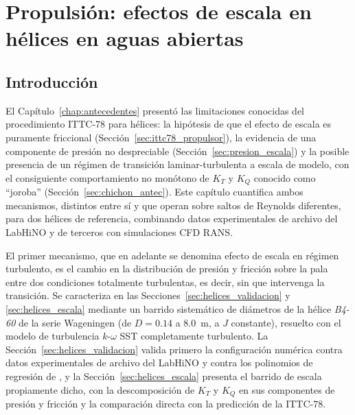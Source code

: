 \chapter{Propulsión: efectos de escala en hélices en aguas abiertas} \label{chap:helices}
\minitoc

\section{Introducción}
\label{sec:helices_intro}

El Capítulo~\ref{chap:antecedentes} presentó las limitaciones conocidas del procedimiento ITTC-78 para hélices: la hipótesis de que el efecto de escala es puramente friccional (Sección~\ref{sec:ittc78_propulsor}), la evidencia de una componente de presión no despreciable (Sección~\ref{sec:presion_escala}) y la posible presencia de un régimen de transición laminar-turbulenta a escala de modelo, con el consiguiente comportamiento no monótono de $K_T$ y $K_Q$ conocido como ``joroba'' (Sección~\ref{sec:chichon_antec}). Este capítulo cuantifica ambos mecanismos, distintos entre sí y que operan sobre saltos de Reynolds diferentes, para dos hélices de referencia, combinando datos experimentales de archivo del LabHiNO y de terceros con simulaciones CFD RANS.

El primer mecanismo, que en adelante se denomina efecto de escala en régimen turbulento, es el cambio en la distribución de presión y fricción sobre la pala entre dos condiciones totalmente turbulentas, es decir, sin que intervenga la transición. Se caracteriza en las Secciones~\ref{sec:helices_validacion} y \ref{sec:helices_escala} mediante un barrido sistemático de diámetros de la hélice \textit{B4-60} de la serie Wageningen (de $D=0.14$ a $8.0$~m, a $J$ constante), resuelto con el modelo de turbulencia $k$-$\omega$ SST completamente turbulento. La Sección~\ref{sec:helices_validacion} valida primero la configuración numérica contra datos experimentales de archivo del LabHiNO y contra los polinomios de regresión de \citet{oosterveld1975}, y la Sección~\ref{sec:helices_escala} presenta el barrido de escala propiamente dicho, con la descomposición de $K_T$ y $K_Q$ en sus componentes de presión y fricción y la comparación directa con la predicción de la ITTC-78.

